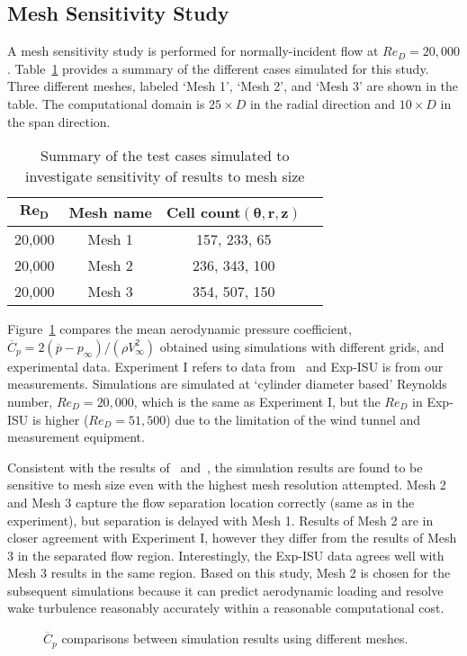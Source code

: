 \subsection{Mesh Sensitivity Study}
\label{sec:mesh_sensitivity}
%
A mesh sensitivity study is performed for normally-incident flow at
$Re_D=20,000$. Table~\ref{tab:meshSize} provides a summary of the different
cases simulated for this study. Three different meshes, labeled `Mesh 1',
`Mesh 2', and `Mesh 3' are shown in the table. The computational domain is
$25\times D$ in the radial direction and $10\times D$ in the span direction.
%
\begin{table}[htb!]
  \caption{Summary of the test cases simulated to investigate sensitivity of results to mesh size} 
  \label{tab:meshSize} 
  \begin{center}
  \begin{tabular}{c|c|c|c}
    $\boldsymbol{Re_D}$ & \textbf{Mesh name} &  \textbf{Cell count}$\boldsymbol{(\theta,r,z)}$ \\ \hline
    \hline
    20,000  & Mesh 1 & 157, 233, 65\\ \hline
    20,000  & Mesh 2 & 236, 343, 100\\ \hline
    20,000  & Mesh 3 & 354, 507, 150\\ \hline \hline
    \hline
  \end{tabular}
  \end{center}
\end {table}

Figure~\ref{fig:Cp_compare_LS_Mesh} compares the mean aerodynamic pressure
coefficient, $\overline{C}_p=2 (\overline{p}-p_\infty)/(\rho V_\infty^2)$
obtained using simulations with different grids, and experimental data.
Experiment I refers to data from~\cite{norberg2013pressure} and Exp-ISU is from
our measurements. Simulations are simulated at `cylinder diameter based'
Reynolds number, $Re_D=20,000$, which is the same as Experiment I, but the
$Re_D$ in Exp-ISU is higher ($Re_D=51,500$) due to the limitation of the wind
tunnel and measurement equipment.

Consistent with the results of~\cite{travin2000detached}
and~\cite{breuer2000challenging}, the simulation results are found to be
sensitive to mesh size even with the highest mesh resolution attempted. Mesh 2
and Mesh 3 capture the flow separation location correctly (same as in the
experiment), but separation is delayed with Mesh 1. Results of Mesh 2 are in
closer agreement with Experiment I, however they differ from the results of
Mesh 3 in the separated flow region. Interestingly, the Exp-ISU data agrees
well with Mesh 3 results in the same region. Based on this study, Mesh 2 is
chosen for the subsequent simulations because it can predict aerodynamic
loading and resolve wake turbulence reasonably accurately within a reasonable
computational cost.
%
\begin{figure}[htb!]
  \centering
  \caption{$\overline{C}_p$ comparisons between simulation results using
  different meshes.}
  \label{fig:Cp_compare_LS_Mesh}
\end{figure}

